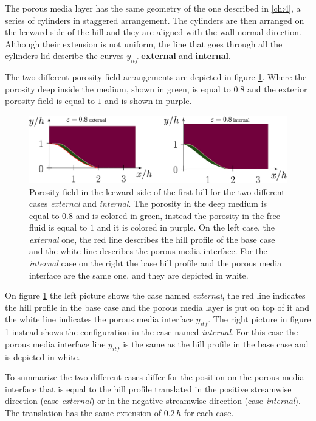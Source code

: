 The porous media layer has the same geometry of the one described in \ref{ch:4}, a series of cylinders in staggered arrangement. The cylinders are then arranged on the leeward side of the hill and they are aligned with the wall normal direction. Although their extension is not uniform, the line that goes through all the cylinders lid describe the curves $y_{itf}$ \textbf{external} and \textbf{internal}.

The two different porosity field arrangements are depicted in figure \ref{fig:por_gauss}. Where the porosity deep inside the medium, shown in green, is equal to $0.8$ and the exterior porosity field is equal to $1$ and is shown in purple.

\begin{figure}[h]
	\centering
	\includegraphics[width=1\linewidth]{chapter_5/figure/por}
	\caption{Porosity field in the leeward side of the first hill for the two different cases \textit{external} and \textit{internal}. The porosity in the deep medium is equal to $0.8$ and is colored in green, instead the porosity in the free fluid is equal to $1$ and it is colored in purple. On the left case, the \textit{external} one, the red line describes the hill profile of the base case and the white line describes the porous media interface. For the \textit{internal} case on the right the base hill profile and the porous media interface are the same one, and they are depicted in white.}
	\label{fig:por_gauss}
\end{figure}

On figure \ref{fig:por_gauss} the left picture shows the case named \textit{external}, the red line indicates the hill profile in the base case and the porous media layer is put on top of it and the white line indicates the porous media interface $y_{itf}$.
The right picture in figure \ref{fig:por_gauss} instead shows the configuration in the case named \textit{internal}. For this case the porous media interface line $y_{itf}$ is the same as the hill profile in the base case and is depicted in white.

To summarize the two different cases differ for the position on the porous media interface that is equal to the hill profile translated in the positive streamwise direction (case \textit{external}) or in the negative streamwise direction (case \textit{internal}). The translation has the same extension of $0.2\,h$ for each case.

